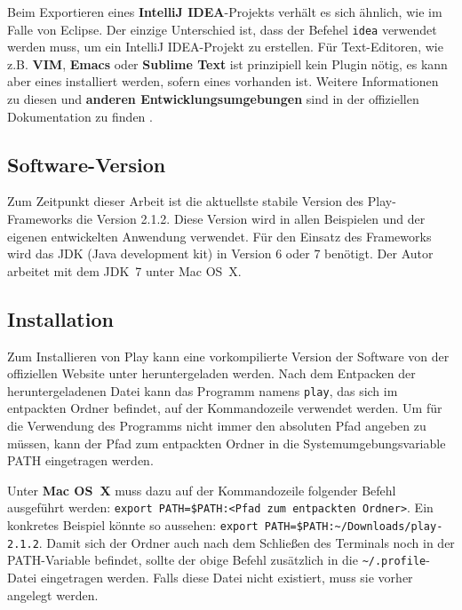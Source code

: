 Beim Exportieren eines \textbf{IntelliJ IDEA}-Projekts verhält es sich ähnlich, wie im Falle von Eclipse.
Der einzige Unterschied ist, dass der Befehel \lstinline|idea| verwendet werden muss, um ein IntelliJ IDEA-Projekt zu erstellen.
Für Text-Editoren, wie z.B. \textbf{VIM}, \textbf{Emacs} oder \textbf{Sublime Text} ist prinzipiell kein Plugin nötig, es kann aber eines installiert werden, sofern eines vorhanden ist.
Weitere Informationen zu diesen und \textbf{anderen Entwicklungsumgebungen} sind in der offiziellen Dokumentation zu finden \cite[vgl.][]{ide}.



\subsection{Software-Version} %
\label{sub:software_version}

Zum Zeitpunkt dieser Arbeit ist die aktuellste stabile Version des Play-Frameworks die Version 2.1.2.
Diese Version wird in allen Beispielen und der eigenen entwickelten Anwendung verwendet.
Für den Einsatz des Frameworks wird das JDK (Java development kit) in Version 6 oder 7 benötigt.
Der Autor arbeitet mit dem JDK~7 unter Mac OS~X.



\subsection{Installation} %
\label{sub:installation}

Zum Installieren von Play kann eine vorkompilierte Version der Software von der offiziellen Website unter \cite{play_download} heruntergeladen werden.
Nach dem Entpacken der heruntergeladenen Datei kann das Programm namens \lstinline|play|, das sich im entpackten Ordner befindet, auf der Kommandozeile verwendet werden.
Um für die Verwendung des Programms nicht immer den absoluten Pfad angeben zu müssen, kann der Pfad zum entpackten Ordner in die Systemumgebungsvariable PATH eingetragen werden.

Unter \textbf{Mac OS~X} muss dazu auf der Kommandozeile folgender Befehl ausgeführt werden: \lstinline|export PATH=$PATH:<Pfad zum entpackten Ordner>|.
Ein konkretes Beispiel könnte so aussehen: \lstinline|export PATH=$PATH:~/Downloads/play-2.1.2|.
Damit sich der Ordner auch nach dem Schließen des Terminals noch in der PATH-Variable befindet, sollte der obige Befehl zusätzlich in die \lstinline|~/.profile|-Datei eingetragen werden.
Falls diese Datei nicht existiert, muss sie vorher angelegt werden.

